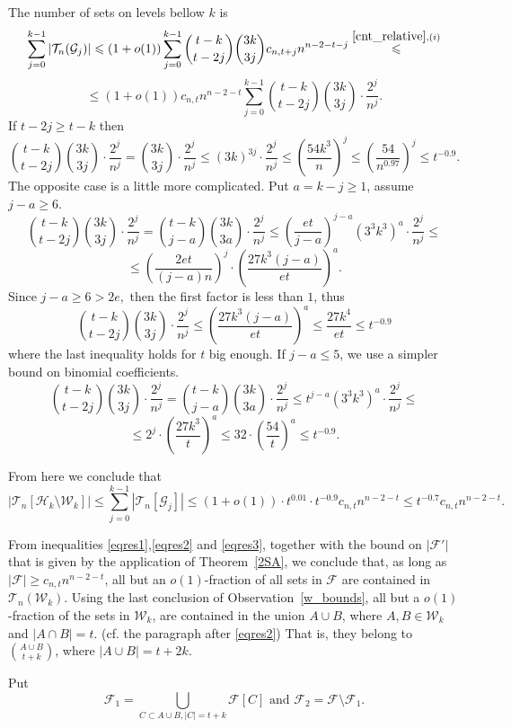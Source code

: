 \documentclass[11pt,letterpaper]{amsart}
\renewcommand{\le}{\leqslant}
\renewcommand{\ge}{\geqslant}
\newcommand{\ff}{\mathcal{F}}
\newcommand{\g}{\mathcal{G}}
\newcommand{\h}{\mathcal H}
\newcommand{\T}{\mathcal{T}}
\newcommand{\W}{\mathcal{W}}
\begin{document}
The number of sets on levels bellow $k$ is $$\sum_{j=0}^{k-1}|\T_n(\g_j)| \le (1+o(1))\sum_{j=0}^{k-1}{t-k \choose t-2j}{3k \choose 3j}c_{n, t+j}n^{n-2-t-j} \overset{\ref{cnt_relative}, (i)}{\le}$$ $$\le (1+o(1))c_{n, t}n^{n-2-t}\sum_{j=0}^{k-1}{t-k \choose t-2j}{3k \choose 3j}\cdot \frac{2^j}{n^j}.$$ If $t - 2j \ge t - k$ then $${t-k \choose t-2j}{3k \choose 3j}\cdot \frac{2^j}{n^j} = {3k \choose 3j}\cdot \frac{2^j}{n^j} \le (3k)^{3j}\cdot \frac{2^j}{n^j} \le \left(\frac{54k^3}{n}\right)^j \le \left(\frac{54}{n^{0.97}}\right)^j \le t^{-0.9}.$$ The opposite case is a little more complicated. Put $a = k - j \ge 1$, assume $j - a \ge 6$. $${t-k\choose t-2j}{3k\choose 3j}\cdot\frac{2^j}{n^j} = {t-k\choose j - a}{3k \choose 3a}\cdot\frac{2^j}{n^j} \le \left(\frac{et}{j - a}\right)^{j - a}(3^3k^3)^a\cdot\frac{2^j}{n^j}\le $$$$\le \left(\frac{2et}{(j-a)n}\right)^j \cdot \left(\frac{27k^3(j - a)}{et}\right)^{a}.$$ Since $j - a \ge 6 > 2e,$ then the first factor is less than $1$, thus $${t-k\choose t-2j}{3k\choose 3j}\cdot\frac{2^j}{n^j} \le \left(\frac{27k^3(j - a)}{et}\right)^{a} \le \frac{27k^4}{et} \le t^{-0.9}$$ where the last inequality holds for $t$ big enough. If $j - a \le 5$, we use a simpler bound on binomial coefficients. $${t-k\choose t-2j}{3k\choose 3j}\cdot\frac{2^j}{n^j} = {t-k\choose j - a}{3k \choose 3a}\cdot\frac{2^j}{n^j} \le t^{j - a}(3^3k^3)^a\cdot\frac{2^j}{n^j} \le$$ $$\le 2^j\cdot\left(\frac{27k^3}{t}\right)^a \le 32\cdot\left(\frac{54}{t}\right)^a \le t^{-0.9}.$$

From here we conclude that 
\begin{equation}\label{eqres3}
  |\T_n[\h_{k}\setminus \W_k]|\le \sum_{j = 0}^{k-1}|\T_n[\g_j]|\le (1+o(1))\cdot t^{0.01} \cdot t^{-0.9} c_{n, t}n^{n-2-t}\le t^{-0.7}c_{n, t}n^{n-2-t}.
\end{equation}


From inequalities \eqref{eqres1},\eqref{eqres2} and \eqref{eqres3}, together with the bound on $|\ff'|$ that is given by the application of Theorem~\ref{2SA}, we conclude that, as long as $|\ff| \ge c_{n, t}n^{n-2-t}$, all but an $o(1)$-fraction of all sets in $\ff$ are contained in $\T_n(\W_k)$. Using the last conclusion of Observation~\ref{w_bounds}, all but a $o(1)$-fraction of the sets in $\W_k$,  are contained in the union $A\cup B$, where $A,B\in \W_k$ and $|A\cap B| = t$. (cf. the paragraph after \eqref{eqres2}) That is, they belong to ${A\cup B\choose t+k}$, where $|A\cup B| =t+2k$.

Put $$\ff_1 = \bigcup_{C\subset A\cup B, |C|=t+k}{\ff[C]} \text{ and } \ff_2 = \ff \setminus \ff_1.$$
\end{document}
